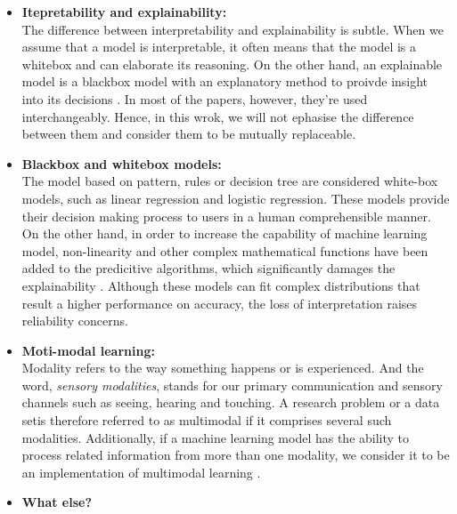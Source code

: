 \begin{itemize}
    \item \textbf{Itepretability and explainability:} \\ The difference between interpretability and explainability is subtle. When we assume that a model is interpretable, it often means that the model is a whitebox and can elaborate its reasoning. On the other hand, an explainable model is a blackbox model with an explanatory method to proivde insight into its decisions \citep{doshivelez2017RigorousInterpretable}. In most of the papers, however, they're used interchangeably. Hence, in this wrok, we will not ephasise the difference between them and consider them to be mutually replaceable. \\
    \item \textbf{Blackbox and whitebox models:} \\ The model based on pattern, rules or decision tree are considered white-box models, such as linear regression and logistic regression. These models provide their decision making process to users in a human comprehensible manner. On the other hand, in order to increase the capability of machine learning model, non-linearity and other complex mathematical functions have been added to the predicitive algorithms, which significantly damages the explainability \citep{LoyolaGonzalez2019BlackBoxVsWhiteBox}. Although  these models can fit complex distributions that result a higher performance on accuracy, the loss of interpretation raises reliability concerns.\\
    \item \textbf{Moti-modal learning:} \\ Modality refers to the way something happens or is experienced. And the word, \textit{sensory modalities}, stands for our primary communication and sensory channels such as seeing, hearing and touching. A research problem or a data setis therefore referred to as multimodal if it comprises several such modalities. Additionally, if a machine learning model has the ability to process related information from more than one modality, we consider it to be an implementation of multimodal learning \citep{Baltrušaitis2019MutimodalSurvey}. \\
    \item \textbf{What else?}
\end{itemize}


